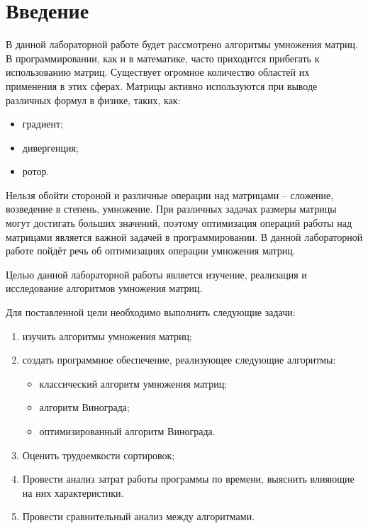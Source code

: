 \chapter*{Введение}

В данной лабораторной работе будет рассмотрено алгоритмы умножения матриц. В программировании, как и в математике, часто приходится прибегать к использованию матриц. Существует огромное количество областей их применения в этих сферах. Матрицы активно используются при выводе различных формул в физике, таких, как:
\begin{itemize}
	\item градиент;
	\item дивергенция;
	\item ротор.
\end{itemize}

Нельзя обойти стороной и различные операции над матрицами – сложение, возведение в степень, умножение. При различных задачах размеры матрицы могут достигать больших значений, поэтому оптимизация операций работы над матрицами является важной задачей в программировании. В данной лабораторной работе пойдёт речь об оптимизациях операции умножения матриц.

Целью данной лабораторной работы является изучение, реализация и исследование алгоритмов умножения матриц.

Для поставленной цели необходимо выполнить следующие задачи:
\begin{enumerate}[label={\arabic*)}]
	\item изучить алгоритмы умножения матриц;
	\item создать программное обеспечение, реализующее следующие алгоритмы:
	\begin{itemize}
		\item классический алгоритм умножения матриц;
		\item алгоритм Винограда;
		\item оптимизированный алгоритм Винограда.
	\end{itemize}
	\item Оценить трудоемкости сортировок;
	\item Провести анализ затрат работы программы по времени, выяснить влияющие на них характеристики.
	\item Провести сравнительный анализ между алгоритмами.
\end{enumerate}